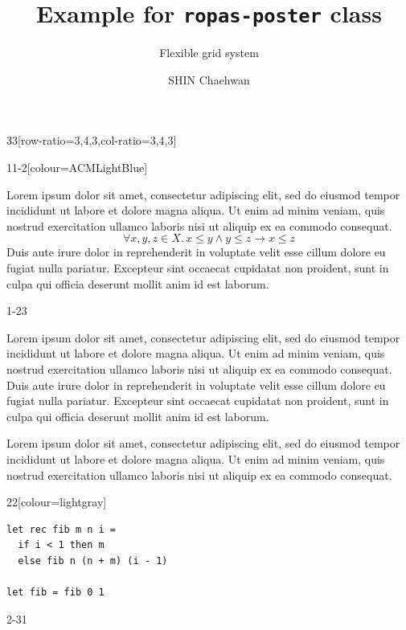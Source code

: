 \documentclass{ropas-poster}
\title{Example for \texttt{ropas-poster} class}
\subtitle{Flexible grid system}
\author{SHIN Chaehwan}
\institute{Programming Research Laboratory (ROPAS), Seoul National University}
\begin{document}
  \begin{postergrid}{3}{3}[row-ratio={3,4,3},col-ratio={3,4,3}]
    \begin{posterblock}{1}{1-2}[colour=ACMLightBlue]

      Lorem ipsum dolor sit amet, consectetur adipiscing elit, sed do eiusmod tempor incididunt ut labore et dolore magna aliqua.
      Ut enim ad minim veniam, quis nostrud exercitation ullamco laboris nisi ut aliquip ex ea commodo consequat.
      \begin{displaymath}
        \forall x,y,z\in X.\,x\leq y\mathrel{\land}y\leq z\rightarrow x\leq z
      \end{displaymath}
      Duis aute irure dolor in reprehenderit in voluptate velit esse cillum dolore eu fugiat nulla pariatur.
      Excepteur sint occaecat cupidatat non proident, sunt in culpa qui officia deserunt mollit anim id est laborum.
    \end{posterblock}

    \begin{posterblock}{1-2}{3}

      Lorem ipsum dolor sit amet, consectetur adipiscing elit, sed do eiusmod tempor incididunt ut labore et dolore magna aliqua.
      Ut enim ad minim veniam, quis nostrud exercitation ullamco laboris nisi ut aliquip ex ea commodo consequat.
      Duis aute irure dolor in reprehenderit in voluptate velit esse cillum dolore eu fugiat nulla pariatur.
      Excepteur sint occaecat cupidatat non proident, sunt in culpa qui officia deserunt mollit anim id est laborum.

      Lorem ipsum dolor sit amet, consectetur adipiscing elit, sed do eiusmod tempor incididunt ut labore et dolore magna aliqua.
      Ut enim ad minim veniam, quis nostrud exercitation ullamco laboris nisi ut aliquip ex ea commodo consequat.
    \end{posterblock}

    \begin{posterblock}{2}{2}[colour=lightgray]

\begin{Verbatim}
let rec fib m n i =
  if i < 1 then m
  else fib n (n + m) (i - 1)

let fib = fib 0 1
\end{Verbatim}
    \end{posterblock}

    \begin{posterblock}{2-3}{1}


\end{posterblock}
\end{postergrid}
\end{document}
